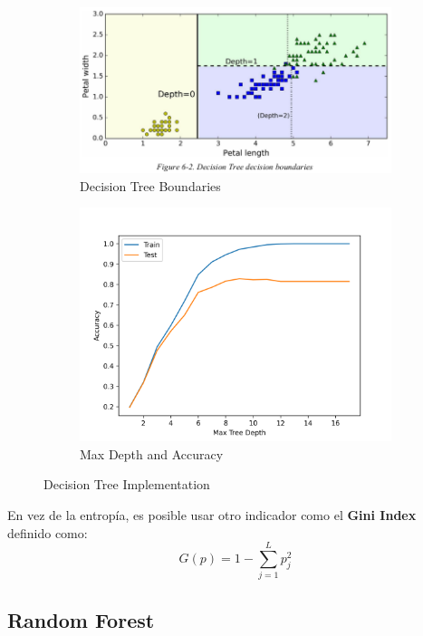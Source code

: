 \begin{figure}[H]
\begin{subfigure}{.5\textwidth}
    \center
    \includegraphics[scale=0.3]{notebooks/ML/img/decision_tree_data.png}
    \caption{Decision Tree Boundaries}
\end{subfigure}%
\begin{subfigure}{.5\textwidth}
    \center
    \includegraphics[scale=0.4]{notebooks/ML/img/max_depth_decision_tree.png}
    \caption{Max Depth and Accuracy}
\end{subfigure}
\caption{Decision Tree Implementation}
\label{fig:fig}
\end{figure}

En vez de la entropía, es posible usar otro indicador como el \textbf{Gini Index} definido como: 
$$G(p) = 1 - \sum_{j=1}^L p_j^2$$

\subsection{Random Forest}